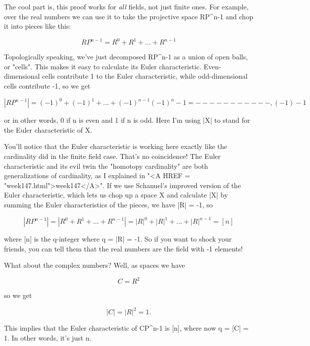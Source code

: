 The cool part is, this proof works for \emph{all} fields, not just finite
ones.  For example, over the real numbers we can use it to take the
projective space RP^{n-1} and chop it into pieces like this:


$$

    RP^{n-1} = R^{0} + R^{1} + ... + R^{n-1} 
$$
    

Topologically speaking, we've just decomposed RP^{n-1} as a
union of open balls, or "cells".  This makes it easy to
calculate its Euler characteristic.  Even-dimensional cells contribute 1
to the Euler characteristic, while odd-dimensional cells contribute -1,
so we get


$$

   |RP^{n-1}| = (-1)^{0} + (-1)^{1} + ... + (-1)^{n-1} 

            (-1)^{n} - 1
          = ----------- ,
             (-1) - 1              
$$
    
or in other words, 0 if n is even and 1 if n is odd.  Here I'm using |X|
to stand for the Euler characteristic of X.

You'll notice that the Euler characteristic is working here exactly like
the cardinality did in the finite field case.  That's no coincidence!
The Euler characteristic and its evil twin the "homotopy
cardinality" are both generalizations of cardinality, as I
explained in "<A HREF = "week147.html">week147</A>".  If we
use Schanuel's improved version of the Euler characteristic, which lets
us chop up a space X and calculate |X| by summing the Euler
characteristics of the pieces, we have |R| = -1, so


$$

       |RP^{n-1}| = |R^{0} + R^{1} + ... + R^{n-1}|

              = |R|^{0} + |R|^{1} + ... + |R|^{n-1}

              = [n]
$$
    
where [n] is the q-integer where q = |R| = -1.  So if you want to shock
your friends, you can tell them that the real numbers are the field with
-1 elements!

What about the complex numbers?  Well, as spaces we have 


$$

C = R^{2}
$$
    
so we get


$$

|C| = |R|^{2} = 1.
$$
    
This implies that the Euler characteristic of CP^{n-1} is [n], where
now q = |C| = 1.  In other words, it's just n.  

